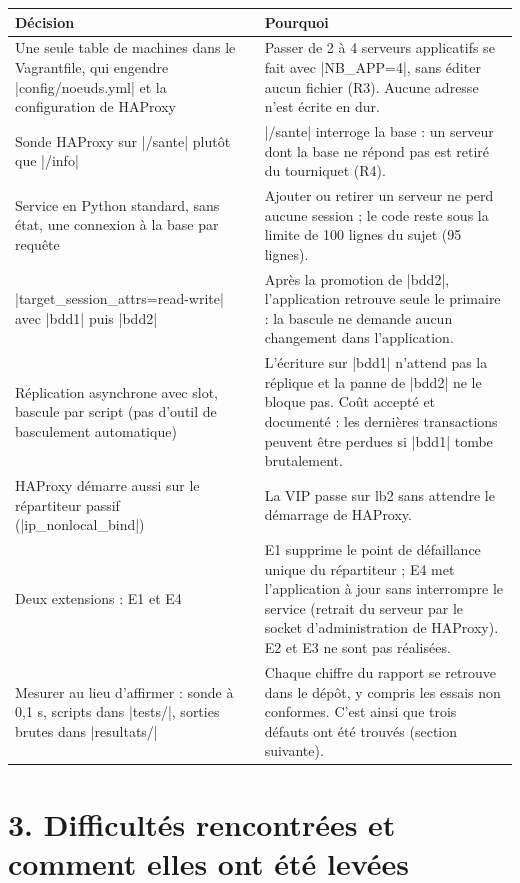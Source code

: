 \documentclass[a4paper,10pt]{article}
\begin{document}
\small
\begin{longtable}{@{}L{4.9cm}L{11.1cm}@{}}
\toprule
\textbf{Décision} & \textbf{Pourquoi}\\
\midrule\endhead
Une seule table de machines dans le Vagrantfile, qui engendre |config/noeuds.yml| et la configuration de HAProxy & Passer de 2 à 4 serveurs applicatifs se fait avec |NB_APP=4|, sans éditer aucun fichier (R3). Aucune adresse n'est écrite en dur.\\
Sonde HAProxy sur |/sante| plutôt que |/info| & |/sante| interroge la base : un serveur dont la base ne répond pas est retiré du tourniquet (R4).\\
Service en Python standard, sans état, une connexion à la base par requête & Ajouter ou retirer un serveur ne perd aucune session ; le code reste sous la limite de 100 lignes du sujet (95 lignes).\\
|target_session_attrs=read-write| avec |bdd1| puis |bdd2| & Après la promotion de |bdd2|, l'application retrouve seule le primaire : la bascule ne demande aucun changement dans l'application.\\
Réplication asynchrone avec slot, bascule par script (pas d'outil de basculement automatique) & L'écriture sur |bdd1| n'attend pas la réplique et la panne de |bdd2| ne le bloque pas. Coût accepté et documenté : les dernières transactions peuvent être perdues si |bdd1| tombe brutalement.\\
HAProxy démarre aussi sur le répartiteur passif (|ip_nonlocal_bind|) & La VIP passe sur lb2 sans attendre le démarrage de HAProxy.\\
Deux extensions : E1 et E4 & E1 supprime le point de défaillance unique du répartiteur ; E4 met l'application à jour sans interrompre le service (retrait du serveur par le socket d'administration de HAProxy). E2 et E3 ne sont pas réalisées.\\
Mesurer au lieu d'affirmer : sonde à 0,1 s, scripts dans |tests/|, sorties brutes dans |resultats/| & Chaque chiffre du rapport se retrouve dans le dépôt, y compris les essais non conformes. C'est ainsi que trois défauts ont été trouvés (section suivante).\\
\bottomrule
\end{longtable}
\normalsize

\newpage
\section*{3. Difficultés rencontrées et comment elles ont été levées}
\end{document}
